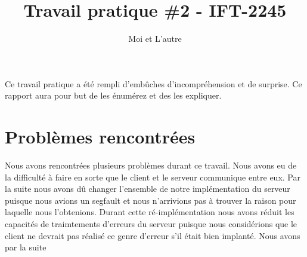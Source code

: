\documentclass[11pt]{article}
\title{Travail pratique \#2 - IFT-2245}
\author{Moi et L'autre}
\begin{document}
\maketitle

Ce travail pratique a été rempli d'embûches d'incompréhension et de surprise.  Ce rapport aura pour but de les énumérez et des les expliquer. 

\section{Problèmes rencontrées}

Nous avons rencontrées plusieurs problèmes durant ce travail. Nous avons eu de la difficulté à faire en sorte que le client et le serveur communique entre eux. Par la suite nous avons dû changer l'ensemble de notre implémentation du serveur puisque nous avions un segfault et nous n'arrivions pas à trouver la raison pour laquelle nous l'obtenions. Durant cette ré-implémentation nous avons réduit les capacités de traimtements d'erreurs du serveur puisque nous considérions que le client ne devrait pas réalisé ce genre d'erreur s'il était bien implanté. Nous avons par la suite 



\end{document}
